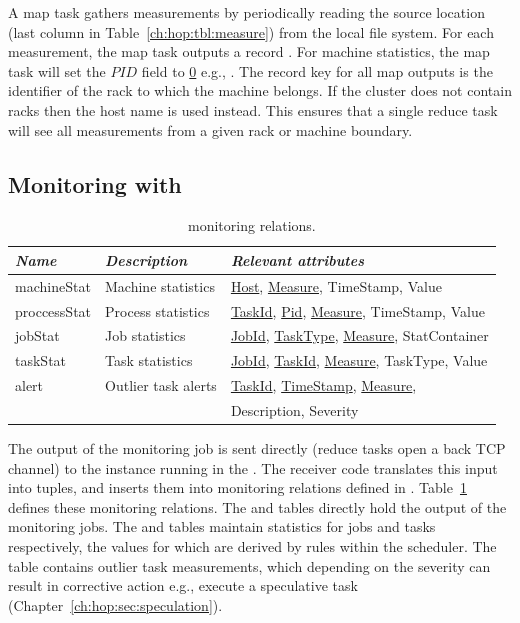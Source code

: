 A map task gathers measurements by periodically reading the source location
(last column in Table~\ref{ch:hop:tbl:measure}) from the local file system.
For each measurement, the map task outputs a record .  For machine statistics,
the map task will set the $PID$ field to {\underline 0} e.g., .  The record key for all map outputs is the
identifier of the rack to which the machine belongs.  If the cluster does not
contain racks then the host name is used instead.  This ensures that a single
reduce task will see all measurements from a given rack or machine boundary.

\subsection{Monitoring with \OVERLOG}

\begin{table}
\ssp
\centering
\begin{tabular}{|l|l|l|} \hline
\textit{Name}    & \textit{Description} & \textit{Relevant attributes} \\ \hline\hline
machineStat    & Machine statistics   & \underline{Host}, \underline{Measure}, TimeStamp, Value \\ \hline
proccessStat   & Process statistics    & \underline{TaskId}, \underline{Pid}, \underline{Measure}, TimeStamp, Value \\ \hline
jobStat              & Job statistics            & \underline{JobId}, \underline{TaskType}, \underline{Measure}, StatContainer \\ \hline
taskStat            & Task statistics          & \underline{JobId}, \underline{TaskId}, \underline{Measure}, TaskType, Value \\ \hline
alert                   & Outlier task alerts   & \underline{TaskId}, \underline{TimeStamp}, \underline{Measure}, \\
                           &                                   & Description, Severity \\ \hline
\end{tabular}
\caption{\JOL monitoring relations.}
\label{ch:hop:tbl:monitorCatalog}
\end{table}

The output of the monitoring job is sent directly (reduce tasks open a back TCP
channel) to the \JOL instance running in the \JT.  The receiver code translates
this input into \JOL tuples, and inserts them into monitoring relations defined
in \JOL.  Table~\ref{ch:hop:tbl:monitorCatalog} defines these monitoring
relations.  The  and  tables directly hold the
output of the monitoring jobs.  The  and  tables
maintain statistics for jobs and tasks respectively, the values for which are
derived by rules within the scheduler.  The  table contains outlier
task measurements, which depending on the severity can result in corrective
action e.g., execute a speculative task (Chapter~\ref{ch:hop:sec:speculation}).

